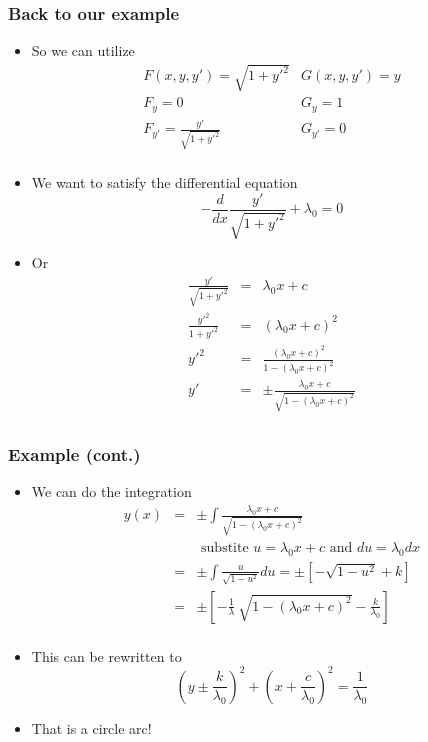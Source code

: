 \documentclass[10pt]{beamer}
\begin{document}
\begin{frame}
  \frametitle{Back to our example}
  \begin{itemize}
  \item So we can utilize
    \[
      \begin{array}{cc}
        F(x,y,y') = \sqrt{ 1 + y'^2 } & G( x, y, y') = y\\
        F_y = 0 & G_y = 1\\
        F_{y'} = \frac{ y' }{ \sqrt{ 1 + y'^2 } } & G_{y'} = 0\\
      \end{array}
    \]
  \item We want to satisfy the differential equation
    \[
      - \frac{d}{dx} \frac{y'}{ \sqrt{ 1+y'^2 } } + \lambda_0 = 0
    \]
  \item Or
    \[
      \begin{array}{rcl}
        \frac{y'}{\sqrt{1+y'^2}} &=& \lambda_0 x + c   \\
        \frac{y'^2}{1+y'^2} &=& (\lambda_0 x+c)^2\\
        y'^2 &=& \frac{(\lambda_0 x + c)^2}{  1 - (\lambda_0 x +c )^2}\\
        y' & =& \pm \frac{\lambda_0 x + c}{\sqrt{1 - (\lambda_0 x +c )^2}}\\
      \end{array}
    \]
  \end{itemize}
\end{frame}

\begin{frame}
  \frametitle{Example (cont.)}
  \begin{itemize}
  \item We can do the integration
    \[
      \begin{array}{rcl}
        y(x) &=& \pm \int \frac{\lambda_0 x + c}{\sqrt{1 - (\lambda_0 x +c )^2}}\\
             && \mbox{ substite } u = \lambda_0 x + c \mbox{ and } du = \lambda_0 dx \\
             &=& \pm \int \frac{u}{\sqrt{1-u^2}} du = \pm \left[ - \sqrt{1-u^2} + k \right] \\
             &=& \pm \left[ - \frac{ 1 }{ \lambda } ~  \sqrt{ 1 - ( \lambda_0 x + c )^2}   - \frac{k}{\lambda_0} \right]\\
      \end{array}
    \]
  \item This can be rewritten to
    \[
      \left( y \pm \frac{k}{\lambda_0} \right)^2  +
      \left( x + \frac{c}{\lambda_0} \right)^2 =
      \frac{1}{\lambda_0}
    \]
  \item That is a circle arc!
  \end{itemize}
\end{frame}
\end{document}
